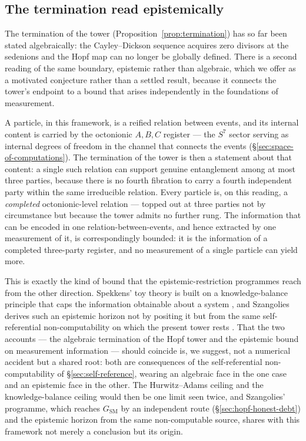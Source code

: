 \subsection{The termination read epistemically}
\label{sec:hopf-information-bound}

The termination of the tower (Proposition~\ref{prop:termination}) has so far been stated
algebraically: the Cayley--Dickson sequence acquires zero divisors at the sedenions and the Hopf map
can no longer be globally defined. There is a second reading of the same boundary, epistemic rather
than algebraic, which we offer as a motivated conjecture rather than a settled result, because it
connects the tower's endpoint to a bound that arises independently in the foundations of measurement.

A particle, in this framework, is a reified relation between events, and its internal content is
carried by the octonionic $A,B,C$ register --- the $S^{7}$ sector serving as internal degrees of
freedom in the channel that connects the events (\S\ref{sec:space-of-computations}). The termination
of the tower is then a statement about that content: a single such relation can support genuine
entanglement among at most three parties, because there is no fourth fibration to carry a fourth
independent party within the same irreducible relation. Every particle is, on this reading, a
\emph{completed} octonionic-level relation --- topped out at three parties not by circumstance but
because the tower admits no further rung. The information that can be encoded in one
relation-between-events, and hence extracted by one measurement of it, is correspondingly bounded:
it is the information of a completed three-party register, and no measurement of a single particle
can yield more.

This is exactly the kind of bound that the epistemic-restriction programmes reach from the other
direction. Spekkens' toy theory is built on a knowledge-balance principle that caps the information
obtainable about a system \autocite{spekkens2007toy}, and Szangolies derives such an epistemic
horizon not by positing it but from the same self-referential non-computability on which the present
tower rests \autocite{szangolies_j_2018}. That the two accounts --- the algebraic termination
of the Hopf tower and the epistemic bound on measurement information --- should coincide is, we
suggest, not a numerical accident but a shared root: both are consequences of the self-referential
non-computability of \S\ref{sec:self-reference}, wearing an algebraic face in the one case and an
epistemic face in the other. The Hurwitz--Adams ceiling and the knowledge-balance ceiling would then
be one limit seen twice, and Szangolies' programme, which reaches $G_{\mathrm{SM}}$ by an independent
route (\S\ref{sec:hopf-honest-debt}) and the epistemic horizon from the same non-computable source,
shares with this framework not merely a conclusion but its origin.

